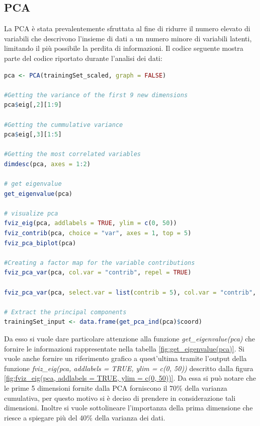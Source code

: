 \documentclass[letterpaper,11pt]{article}
\begin{document}
\subsection{PCA}
La PCA è stata prevalentemente sfruttata al fine di ridurre il numero elevato di variabili che descrivono l'insieme di dati a un numero minore di variabili latenti, limitando il più possibile la perdita di informazioni. Il codice seguente mostra parte del codice riportato durante l'analisi dei dati:
\begin{lstlisting}[language=R]
pca <- PCA(trainingSet_scaled, graph = FALSE)

#Getting the variance of the first 9 new dimensions
pca$eig[,2][1:9]

#Getting the cummulative variance
pca$eig[,3][1:5]

#Getting the most correlated variables
dimdesc(pca, axes = 1:2)

# get eigenvalue
get_eigenvalue(pca)

# visualize pca
fviz_eig(pca, addlabels = TRUE, ylim = c(0, 50))
fviz_contrib(pca, choice = "var", axes = 1, top = 5)
fviz_pca_biplot(pca)

#Creating a factor map for the variable contributions
fviz_pca_var(pca, col.var = "contrib", repel = TRUE)

fviz_pca_var(pca, select.var = list(contrib = 5), col.var = "contrib", repel = TRUE)

# Extract the principal components
trainingSet_input <- data.frame(get_pca_ind(pca)$coord)
\end{lstlisting}
Da esso si vuole dare particolare attenzione alla funzione \textit{get\_eigenvalue(pca)} che fornire le informazioni rappresentate nella tabella \ref{fig:get_eigenvalue(pca)}. Si vuole anche fornire un riferimento grafico a quest'ultima tramite l'output della funzione \textit{fviz\_eig(pca, addlabels = TRUE, ylim = c(0, 50))} descritto dalla figura \ref{fig:fviz_eig(pca, addlabels = TRUE, ylim = c(0, 50))}. Da essa si può notare che le prime 5 dimensioni fornite dalla PCA forniscono il 70\% della varianza cumulativa, per questo motivo si è deciso di prendere in considerazione tali dimensioni. Inoltre si vuole sottolineare l'importanza della prima dimensione che riesce a spiegare più del 40\% della varianza dei dati.
\end{document}
